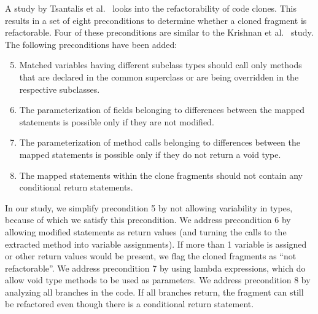 A study by Tsantalis et al.~\cite{tsantalis2015assessing} looks into the refactorability of code clones. This results in a set of eight preconditions to determine whether a cloned fragment is refactorable. Four of these preconditions are similar to the Krishnan et al.~\cite{krishnan2014unification} study. The following preconditions have been added:
\begin{enumerate}
  \setcounter{enumi}{4}
  \item Matched variables having different subclass types should call only methods that are declared in the common superclass or are being overridden in the respective subclasses.
  \item The parameterization of fields belonging to differences between the mapped statements is possible only if they are not modified.
  \item The parameterization of method calls belonging to differences between the mapped statements is possible only if they do not return a void type.
  \item The mapped statements within the clone fragments should not contain any conditional return statements.
\end{enumerate}
In our study, we simplify precondition 5 by not allowing variability in types, because of which we satisfy this precondition. We address precondition 6 by allowing modified statements as return values (and turning the calls to the extracted method into variable assignments). If more than 1 variable is assigned or other return values would be present, we flag the cloned fragments as ``not refactorable''. We address precondition 7 by using lambda expressions, which do allow void type methods to be used as parameters. We address precondition 8 by analyzing all branches in the code. If all branches return, the fragment can still be refactored even though there is a conditional return statement.
